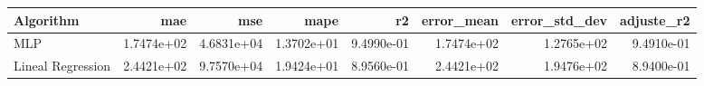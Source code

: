 \begin{tabular}{lrrrrrrr}
\toprule
Algorithm & mae & mse & mape & r2 & error_mean & error_std_dev & adjuste_r2 \\
\midrule
MLP & 1.7474e+02 & 4.6831e+04 & 1.3702e+01 & 9.4990e-01 & 1.7474e+02 & 1.2765e+02 & 9.4910e-01 \\
Lineal Regression & 2.4421e+02 & 9.7570e+04 & 1.9424e+01 & 8.9560e-01 & 2.4421e+02 & 1.9476e+02 & 8.9400e-01 \\
\bottomrule
\end{tabular}
